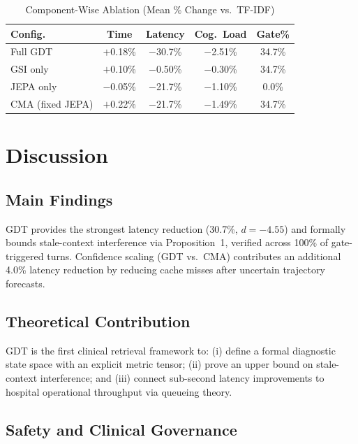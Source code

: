 \documentclass[11pt,a4paper]{article}
\begin{document}
\begin{table}[!t]
  \centering
  \caption{Component-Wise Ablation (Mean \% Change vs.\ TF-IDF)}
  \label{tab:ablation}
  \renewcommand{\arraystretch}{1.15}
  \begin{tabular}{lcccc}
    \toprule
    \textbf{Config.}   & \textbf{Time} & \textbf{Latency} & \textbf{Cog.\ Load} & \textbf{Gate\%} \\
    \midrule
    Full GDT             & $+$0.18\%  & $-$30.7\%  & $-$2.51\% & 34.7\% \\
    GSI only             & $+$0.10\%  & $-$0.50\%  & $-$0.30\% & 34.7\% \\
    JEPA only            & $-$0.05\%  & $-$21.7\%  & $-$1.10\% & 0.0\%  \\
    CMA (fixed JEPA)     & $+$0.22\%  & $-$21.7\%  & $-$1.49\% & 34.7\% \\
    \bottomrule
  \end{tabular}
\end{table}

\section{Discussion}
\label{sec:discussion}

\subsection{Main Findings}

GDT provides the strongest latency reduction (30.7\%, $d{=}{-4.55}$) and formally bounds stale-context interference via Proposition~1, verified across 100\% of gate-triggered turns. Confidence scaling (GDT vs.\ CMA) contributes an additional 4.0\% latency reduction by reducing cache misses after uncertain trajectory forecasts.

\subsection{Theoretical Contribution}

GDT is the first clinical retrieval framework to: (i) define a formal diagnostic state space with an explicit metric tensor; (ii) prove an upper bound on stale-context interference; and (iii) connect sub-second latency improvements to hospital operational throughput via queueing theory.

\subsection{Safety and Clinical Governance}
\end{document}
